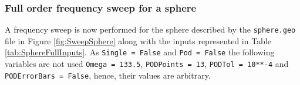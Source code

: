 \subsubsection{Full order frequency sweep for a sphere}
A frequency sweep is now performed for the sphere described by the \texttt{sphere.geo} file in Figure \ref{fig:SweepSphere} along with the inputs represented in Table \ref{tab:SphereFullInputs}. As  \texttt{Single = False} and \texttt{Pod = False} the following variables are not used \texttt{Omega = 133.5}, \texttt{PODPoints = 13}, \texttt{PODTol = 10**-4} and \texttt{PODErrorBars = False}, hence, their values are arbitrary.
